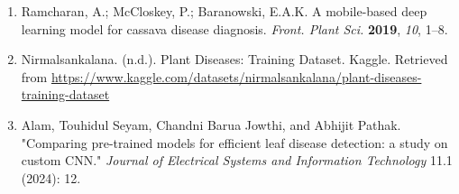 \documentclass{article}
\begin{document}
\begin{enumerate}
    \item Ramcharan, A.; McCloskey, P.; Baranowski, E.A.K. A mobile-based deep learning model for cassava disease diagnosis. \textit{Front. Plant Sci.} \textbf{2019}, \textit{10}, 1–8.

    \item
    Nirmalsankalana. (n.d.). Plant Diseases: Training Dataset. Kaggle. Retrieved from \url{https://www.kaggle.com/datasets/nirmalsankalana/plant-diseases-training-dataset}

    \item
    Alam, Touhidul Seyam, Chandni Barua Jowthi, and Abhijit Pathak. "Comparing pre-trained models for efficient leaf disease detection: a study on custom CNN." \textit{Journal of Electrical Systems and Information Technology} 11.1 (2024): 12.


\end{enumerate}
\end{document}
